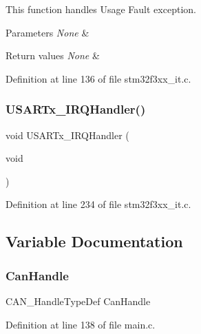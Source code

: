 This function handles Usage Fault exception. 


\begin{DoxyParams}{Parameters}
{\em None} & \\
\hline
\end{DoxyParams}

\begin{DoxyRetVals}{Return values}
{\em None} & \\
\hline
\end{DoxyRetVals}


Definition at line 136 of file stm32f3xx\+\_\+it.\+c.

\mbox{\label{group___c_a_n___networking_ga2bcc89e045c320ff135e7967dbb8d169}} 
\subsubsection{U\+S\+A\+R\+Tx\+\_\+\+I\+R\+Q\+Handler()}
{\footnotesize\ttfamily void U\+S\+A\+R\+Tx\+\_\+\+I\+R\+Q\+Handler (\begin{DoxyParamCaption}\item[{void}]{ }\end{DoxyParamCaption})}



Definition at line 234 of file stm32f3xx\+\_\+it.\+c.



\subsection{Variable Documentation}
\mbox{\label{group___c_a_n___networking_ga71836aa79f107e6d2c027d4161658c88}} 
\subsubsection{Can\+Handle}
{\footnotesize\ttfamily C\+A\+N\+\_\+\+Handle\+Type\+Def Can\+Handle}



Definition at line 138 of file main.\+c.

\mbox{\label{group___c_a_n___networking_ga150fa4ada51062c96df347829360bcf4}} 
